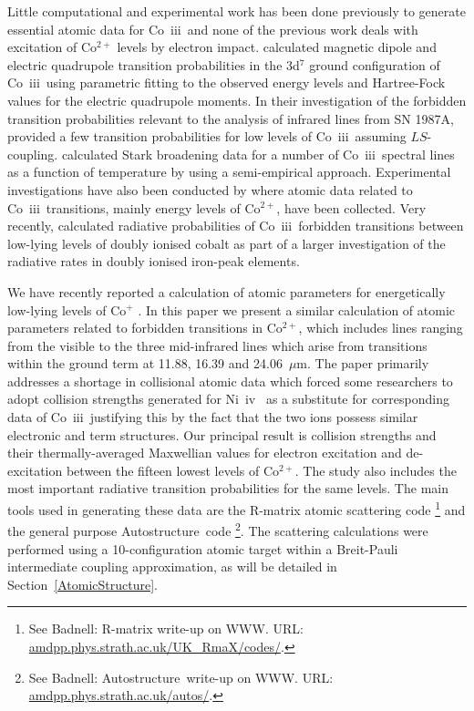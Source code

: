 \documentclass[useAMS,usenatbib]{mn2e}
\newcommand{\AS}    {{\sc Autostructure}}
\newcommand{\III}     {~{\sc iii}}
\newcommand{\IV}     {~{\sc iv}}
\begin{document}
Little computational and experimental work has been done previously to generate essential atomic
data for Co\III\ and none of the previous work deals with excitation of Co$^{2+}$ levels by
electron impact. \citet{HansenRU1984} calculated magnetic dipole and electric quadrupole transition
probabilities in the 3d$^7$ ground configuration of Co\III\ using parametric fitting to the
observed energy levels and Hartree-Fock values for the electric quadrupole moments. In their
investigation of the forbidden transition probabilities relevant to the analysis of infrared lines
from SN 1987A, \citet{NussbaumerS1988} provided a few transition probabilities for low levels of
Co\III\ assuming $LS$-coupling. \citet{TankosicPD2003} calculated Stark broadening data for a
number of Co\III\ spectral lines as a function of temperature by using a semi-empirical approach.
Experimental investigations have also been conducted by \citet{SugarC1981, SugarC1985} where atomic
data related to Co\III\ transitions, mainly energy levels of Co$^{2+}$, have been collected. Very
recently, \citet{FivetQB2016} calculated radiative probabilities of Co\III\ forbidden transitions
between low-lying levels of doubly ionised cobalt as part of a larger investigation of the
radiative rates in doubly ionised iron-peak elements.

We have recently reported a calculation of atomic parameters for energetically low-lying levels of
Co$^+$ \citep{StoreyZS15}. In this paper we present a similar calculation of atomic parameters
related to forbidden transitions in Co$^{2+}$, which includes lines ranging from the visible to the
three mid-infrared lines which arise from transitions within the ground term at 11.88, 16.39 and
24.06~$\mu$m. The paper primarily addresses a shortage in collisional atomic data which forced some
researchers \citep{DessartHBK2014, ChildressHSSMe2015} to adopt collision strengths generated for
Ni\IV\ \citep{SunderlandNBB2002} as a substitute for corresponding data of Co\III\ justifying this
by the fact that the two ions possess similar electronic and term structures. Our principal result
is collision strengths and their thermally-averaged Maxwellian values for electron excitation and
de-excitation between the fifteen lowest levels of Co$^{2+}$. The study also includes the most
important radiative transition probabilities for the same levels. The main tools used in generating
these data are the R-matrix atomic scattering code \citep{BerringtonBCCRT1974,
BerringtonBBSSTY1987, HummerBEPST1993, BerringtonEN1995}\footnote{{See Badnell: R-matrix write-up
on WWW. URL: \url{amdpp.phys.strath.ac.uk/UK_RmaX/codes/}.}} and the general purpose \AS\ code
\citep{EissnerJN1974, NussbaumerS1978, AS2011}\footnote{{See Badnell: \AS\ write-up on WWW. URL:
\url{amdpp.phys.strath.ac.uk/autos/}.}}. The scattering calculations were performed using a
10-configuration atomic target within a Breit-Pauli intermediate coupling approximation, as will be
detailed in Section~\ref{AtomicStructure}.
\end{document}
